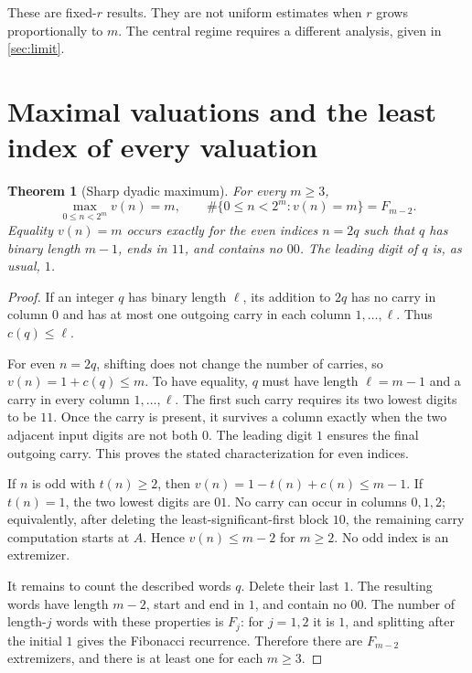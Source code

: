 \documentclass[11pt]{article}
\newtheorem{theorem}{Theorem}[section]
\theoremstyle{definition}\newtheorem{definition}[theorem]{Definition}
\theoremstyle{remark}\newtheorem{remark}[theorem]{Remark}
\begin{document}
These are fixed-$r$ results. They are not uniform estimates when $r$
grows proportionally to $m$. The central regime requires a different
analysis, given in \cref{sec:limit}.

\section{Maximal valuations and the least index of every valuation}\label{sec:extremes}

\begin{theorem}[Sharp dyadic maximum]\label{thm:max}
For every $m\geq3$,
\begin{equation}\label{eq:max}
 \max_{0\leq n<2^m}v(n)=m,
 \qquad \#\{0\leq n<2^m:v(n)=m\}=F_{m-2}.
\end{equation}
Equality $v(n)=m$ occurs exactly for the even indices $n=2q$ such that
$q$ has binary length $m-1$, ends in $11$, and contains no $00$.
The leading digit of $q$ is, as usual, $1$.
\end{theorem}
\begin{proof}
If an integer $q$ has binary length $\ell$, its addition to $2q$ has no
carry in column $0$ and has at most one outgoing carry in each column
$1,\ldots,\ell$. Thus $c(q)\leq\ell$.

For even $n=2q$, shifting does not change the number of carries, so
$v(n)=1+c(q)\leq m$. To have equality, $q$ must have length $\ell=m-1$
and a carry in every column $1,\ldots,\ell$. The first such carry
requires its two lowest digits to be $11$. Once the carry is present,
it survives a column exactly when the two adjacent input digits are not
both $0$. The leading digit $1$ ensures the final outgoing carry.
This proves the stated characterization for even indices.

If $n$ is odd with $t(n)\geq2$, then
$v(n)=1-t(n)+c(n)\leq m-1$. If $t(n)=1$, the two lowest digits are $01$.
No carry can occur in columns $0,1,2$; equivalently, after deleting the
least-significant-first block $10$, the remaining carry computation
starts at $A$. Hence $v(n)\leq m-2$ for $m\geq2$. No odd index is an
extremizer.

It remains to count the described words $q$. Delete their last $1$.
The resulting words have length $m-2$, start and end in $1$, and contain
no $00$. The number of length-$j$ words with these properties is $F_j$:
for $j=1,2$ it is $1$, and splitting after the initial $1$ gives the
Fibonacci recurrence. Therefore there are $F_{m-2}$ extremizers, and
there is at least one for each $m\geq3$.
\end{proof}
\end{document}
